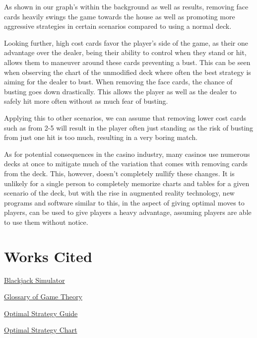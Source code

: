 \documentclass{article}
\begin{document}
{        As shown in our graph's within the background as well as results, removing face cards heavily swings the game towards the house as well as promoting more aggressive strategies in certain scenarios compared to using a normal deck. 
        
        Looking further, high cost cards favor the player's side of the game, as their one advantage over the dealer, being their ability to control when they stand or hit, allows them to maneuver around these cards preventing a bust. This can be seen when observing the chart of the unmodified deck where often the best strategy is aiming for the dealer to bust. When removing the face cards, the chance of busting goes down drastically. This allows the player as well as the dealer to safely hit more often without as much fear of busting. 

        Applying this to other scenarios, we can assume that removing lower cost cards such as from 2-5 will result in the player often just standing as the risk of busting from just one hit is too much, resulting in a very boring match. 
        
        As for potential consequences in the casino industry, many casinos use numerous decks at once to mitigate much of the variation that comes with removing cards from the deck. This, however, doesn't completely nullify these changes. It is unlikely for a single person to completely memorize charts and tables for a given scenario of the deck, but with the rise in augmented reality technology, new programs and software similar to this, in the aspect of giving optimal moves to players, can be used to give players a heavy advantage, assuming players are able to use them without notice.

	\section{Works Cited}
	\label{sec: Works Cited}

	\href{https://github.com/hosua/blackjack-cs241}{Blackjack Simulator}

	\href{https://en.wikipedia.org/wiki/Glossary\_of\_game\_theory}{Glossary of Game Theory}

	\href{https://www.kjartan.co.uk/games/blackjack.htm}{Optimal Strategy Guide}

	\href{https://www.kjartan.co.uk/games/pix/cards/Blackjack%20full%20guide.pdf}{Optimal Strategy Chart}
}
\end{document}
